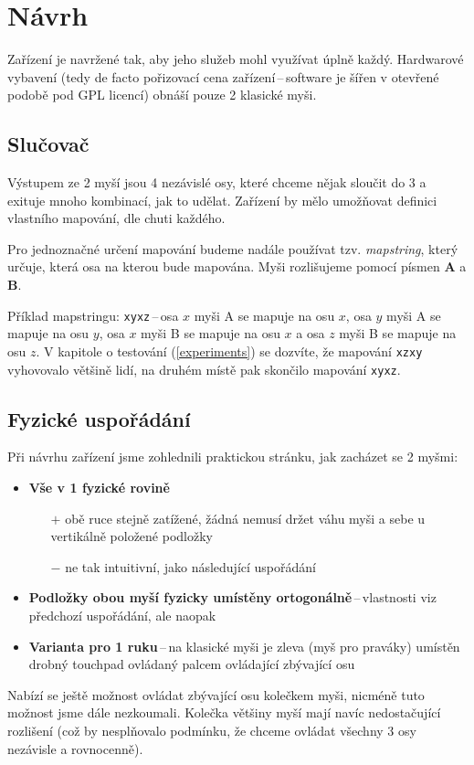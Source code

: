 
\section{Návrh}

Zařízení je navržené tak, aby jeho služeb mohl využívat úplně každý.
Hardwarové vybavení (tedy de facto pořizovací cena zařízení\,--\,software
je šířen v otevřené podobě pod GPL licencí) obnáší pouze 2 klasické myši.

\subsection{Slučovač}\label{merging}

Výstupem ze 2 myší jsou 4 nezávislé osy, které chceme nějak sloučit
do 3 a exituje mnoho kombinací, jak to udělat. Zařízení by mělo umožňovat
definici vlastního mapování, dle chuti každého.

Pro jednoznačné určení mapování budeme nadále používat tzv. {\it mapstring},
který určuje, která osa na kterou bude mapována. Myši rozlišujeme pomocí
písmen {\bf A} a {\bf B}.

Příklad mapstringu: {\tt xyxz}\,--\,osa $x$ myši A se mapuje na osu $x$, osa $y$ myši A se
mapuje na osu $y$, osa $x$ myši B se mapuje na osu $x$ a osa $z$ myši B se
mapuje na osu $z$.
V kapitole o testování (\ref{experiments}) se dozvíte, že mapování {\tt xzxy}
vyhovovalo většině lidí, na druhém místě pak skončilo mapování {\tt xyxz}.

\subsection{Fyzické uspořádání}

Při návrhu zařízení jsme zohlednili praktickou stránku, jak zacházet
se 2 myšmi:
\begin{itemize}
\item{{\bf Vše v 1 fyzické rovině}}
    \begin{itemize}
    \item[$+$]{ obě ruce stejně zatížené, žádná nemusí držet váhu myši a sebe u vertikálně položené podložky}
    \item[$-$]{ ne tak intuitivní, jako následující uspořádání}
    \end{itemize}
\item{{\bf Podložky obou myší fyzicky umístěny ortogonálně}\,--\,vlastnosti viz předchozí uspořádání, ale naopak}
\item{{\bf Varianta pro 1 ruku}\,--\,na klasické myši je zleva (myš pro praváky) umístěn drobný touchpad ovládaný palcem ovládající zbývající osu}

\end{itemize}
Nabízí se ještě možnost ovládat zbývající osu kolečkem myši, nicméně
tuto možnost jsme dále nezkoumali. Kolečka většiny myší mají navíc nedostačující
rozlišení (což by nesplňovalo podmínku, že chceme ovládat všechny 3 osy nezávisle
a rovnocenně).
\clearpage
